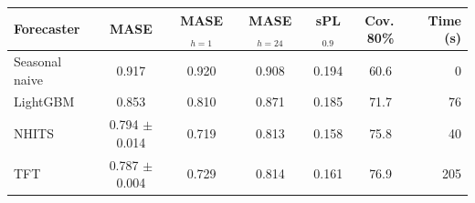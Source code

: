 \begin{tabular}{lcccccr}
\toprule
Forecaster & MASE & MASE$_{h=1}$ & MASE$_{h=24}$ & sPL$_{0.9}$ & Cov.\,80\% & Time (s) \\
\midrule
Seasonal naive & 0.917 & 0.920 & 0.908 & 0.194 & 60.6 & 0 \\
LightGBM & 0.853 & 0.810 & 0.871 & 0.185 & 71.7 & 76 \\
NHITS & 0.794 $\pm$ 0.014 & 0.719 & 0.813 & 0.158 & 75.8 & 40 \\
TFT & 0.787 $\pm$ 0.004 & 0.729 & 0.814 & 0.161 & 76.9 & 205 \\
\bottomrule
\end{tabular}
